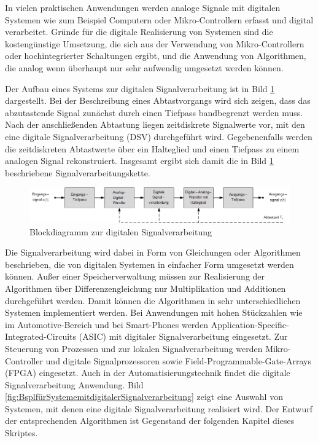 \noindent In vielen praktischen Anwendungen werden analoge Signale mit digitalen Systemen wie zum Beispiel Computern oder Mikro-Controllern erfasst und digital verarbeitet. Gründe für die digitale Realisierung von Systemen sind die kostengünstige Umsetzung, die sich aus der Verwendung von Mikro-Controllern oder hochintegrierter Schaltungen ergibt, und die Anwendung von Algorithmen, die analog wenn überhaupt nur sehr aufwendig umgesetzt werden können. 

\noindent Der Aufbau eines Systems zur digitalen Signalverarbeitung ist in Bild \ref{fig:SignalflussDSV} dargestellt. Bei der Beschreibung eines Abtastvorgangs wird sich zeigen, dass das abzutastende Signal zunächst durch einen Tiefpass bandbegrenzt werden muss. Nach der anschlie{\ss}enden Abtastung liegen zeitdiskrete Signalwerte vor, mit den eine digitale Signalverarbeitung (DSV) durchgeführt wird. Gegebenenfalls werden die zeitdiskreten Abtastwerte über ein Halteglied und einen Tiefpass zu einem analogen Signal rekonstruiert. Insgesamt ergibt sich damit die in Bild \ref{fig:SignalflussDSV} beschriebene Signalverarbeitungskette.


\begin{figure}[H]
  \centerline{\includegraphics[width=1\textwidth]{Einleitung/Bilder/image1.png}}
  \caption{Blockdiagramm zur digitalen Signalverarbeitung}
  \label{fig:SignalflussDSV}
\end{figure}

\noindent Die Signalverarbeitung wird dabei in Form von Gleichungen oder Algorithmen beschrieben, die von digitalen Systemen in einfacher Form umgesetzt werden können. Au{\ss}er einer Speicherverwaltung müssen zur Realisierung der Algorithmen über Differenzengleichung nur Multiplikation und Additionen durchgeführt werden. Damit können die Algorithmen in sehr unterschiedlichen Systemen implementiert werden. Bei Anwendungen mit hohen Stückzahlen wie im Automotive-Bereich und bei Smart-Phones werden Application-Specific-Integrated-Circuits (ASIC) mit digitaler Signalverarbeitung eingesetzt. Zur Steuerung von Prozessen und zur lokalen Signalverarbeitung werden Mikro-Controller und digitale Signalprozessoren sowie Field-Programmable-Gate-Arrays (FPGA) eingesetzt. Auch in der Automatisierungstechnik findet die digitale Signalverarbeitung Anwendung. Bild \ref{fig:BsplfürSystememitdigitalerSignalverarbeitung} zeigt eine Auswahl von Systemen, mit denen eine digitale Signalverarbeitung realisiert wird. Der Entwurf der entsprechenden Algorithmen ist Gegenstand der folgenden Kapitel dieses Skriptes.

